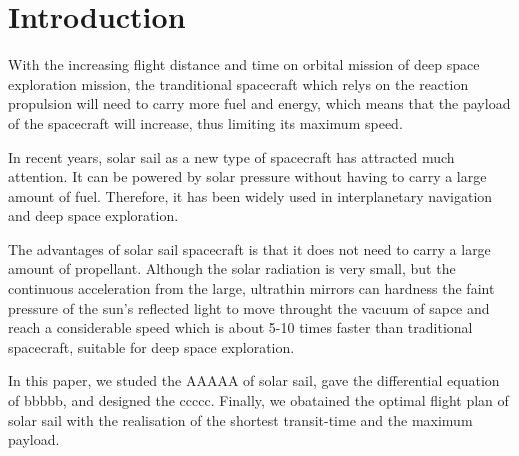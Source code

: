 \documentclass[../Paper.tex]{subfiles}
\begin{document}
\section{Introduction}	


With the increasing flight distance and time on orbital mission of deep space exploration mission, the tranditional spacecraft which relys on the reaction propulsion will need to carry more fuel and energy, which means that the payload of the spacecraft will increase, thus limiting its maximum speed.            

In recent years, solar sail as a new type of spacecraft has attracted much attention. It can be powered by solar pressure without having to carry a large amount of fuel. Therefore, it has been widely used in interplanetary navigation and deep space exploration. 


The advantages of solar sail spacecraft is that it does not need to carry a large amount of propellant. Although the solar radiation is very small, but the continuous acceleration from the large, ultrathin mirrors can hardness the faint pressure of the sun's reflected light to move throught the vacuum of sapce and reach a considerable speed which is about 5-10 times faster than traditional spacecraft, suitable for deep space exploration.            

In this paper, we studed the AAAAA of solar sail, gave the differential equation of bbbbb, and designed the ccccc. Finally, we obatained the optimal flight plan of solar sail with the realisation of the shortest transit-time and the maximum payload. 
\end{document}
